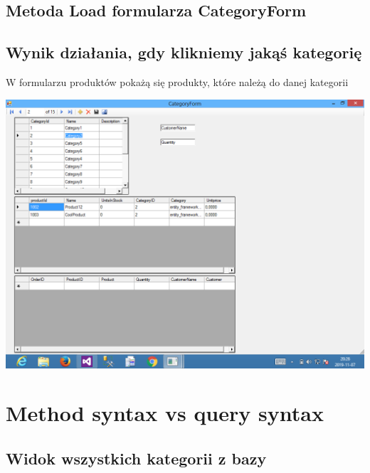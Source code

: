 \documentclass[a4paper, 11pt]{article}
\begin{document}
    \subsection{Metoda Load formularza CategoryForm}
    
    
    \newpage
    
    \subsection{Wynik działania, gdy klikniemy jakąś kategorię}
    
    W formularzu produktów pokażą się produkty, które należą do danej kategorii
    
     \begin{center}
        \includegraphics{images/CategoryForm3.png}
    \end{center}
    
    \newpage
    
    \section{Method syntax vs query syntax}
    
    \subsection{Widok wszystkich kategorii z bazy}
    
\end{document}
